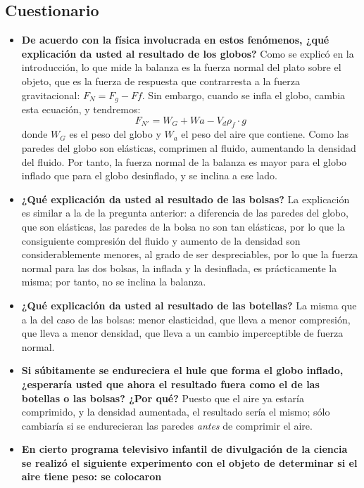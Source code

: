 \documentclass[12pt]{article}
\begin{document}
\subsection{Cuestionario}
\begin{itemize}
    \item \textbf{De acuerdo con la física involucrada en estos fenómenos, ¿qué explicación da usted al resultado de los globos?} 
    Como se explicó en la introducción, lo que mide la balanza es la fuerza normal del plato sobre el objeto, que es la fuerza de respuesta que contrarresta a la fuerza gravitacional: $F_{N}=F_{g}-F{f}$. Sin embargo, cuando se infla el globo, cambia esta ecuación, y tendremos:
    \begin{equation}
        F_{N'}=W_{G}+W{a}-V_{d}\rho_{f}\cdot g
    \end{equation}
    donde $W_{G}$ es el peso del globo y $W_{a}$ el peso del aire que contiene. Como las paredes del globo son elásticas, comprimen al fluido, aumentando la densidad del fluido. Por tanto, la fuerza normal de la balanza es mayor para el globo inflado que para el globo desinflado, y se inclina a ese lado.
    \item \textbf{¿Qué explicación da usted al resultado de las bolsas?}
    La explicación es similar a la de la pregunta anterior: a diferencia de las paredes del globo, que son elásticas, las paredes de la bolsa no son tan elásticas, por lo que la consiguiente compresión del fluido y aumento de la densidad son considerablemente menores, al grado de ser despreciables, por lo que la fuerza normal para las dos bolsas, la inflada y la desinflada, es prácticamente la misma; por tanto, no se inclina la balanza.
    \item \textbf{¿Qué explicación da usted al resultado de las botellas?}
    La misma que a la del caso de las bolsas: menor elasticidad, que lleva a menor compresión, que lleva a menor densidad, que lleva a un cambio imperceptible de fuerza normal.
    \item \textbf{Si súbitamente se endureciera el hule que forma el globo inflado, ¿esperaría usted
que ahora el resultado fuera como el de las botellas o las bolsas? ¿Por qué?}
    Puesto que el aire ya estaría comprimido, y la densidad aumentada, el resultado sería el mismo; sólo cambiaría si se endurecieran las paredes \emph{antes} de comprimir el aire.
    \item \textbf{En cierto programa televisivo infantil de divulgación de la ciencia se realizó el
siguiente experimento con el objeto de determinar si el aire tiene peso: se colocaron
}
\end{itemize}
\end{document}
